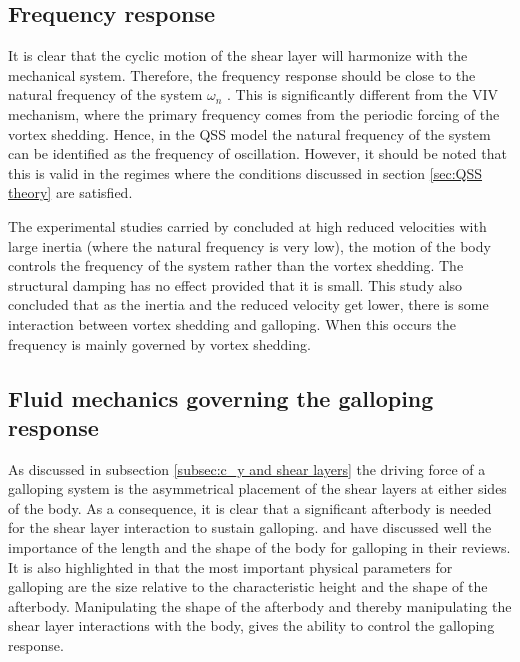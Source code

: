 \subsection{Frequency response}
 
 It is clear that the cyclic motion of the shear layer will harmonize with the mechanical system. Therefore, the frequency response should be close to the natural frequency of the system $\omega_{n}$ \citep{Paidoussis2010}. This is significantly different from the VIV mechanism, where the primary frequency comes from the periodic forcing of the vortex shedding. Hence, in the QSS model the natural frequency of the system can be identified as the frequency of oscillation. However, it should be  noted that this is valid in the regimes where the conditions discussed in section \ref{sec:QSS theory} are satisfied. 
 
 The experimental studies carried by \citet{bouclin:77} concluded at high reduced velocities with large inertia (where the natural frequency is very low), the motion of the body controls the frequency of the system rather than the vortex shedding. The structural damping has no effect provided that it is small. This study also concluded that as the inertia and the reduced velocity get lower, there is some interaction between vortex shedding and galloping. When this occurs the frequency is mainly governed by vortex shedding. 
 
 \subsection{Fluid mechanics governing the galloping response}
 \label{subsec:fluid_mechanics_of_galloping}
 
 As discussed in subsection \ref{subsec:c_y and shear layers} the driving force of a galloping system is the asymmetrical placement of the shear layers at either sides of the body. As a consequence, it is clear that a significant afterbody is needed for the shear layer interaction to sustain galloping. \citet{Parkinson1974,Parkinson1989} and \citet{Bearman1987} have discussed well the importance of the length and the shape of the body for galloping in their reviews. It is also highlighted in \citet{Parkinson1974} that the most important physical parameters for galloping are the size relative to the characteristic height and the shape of the afterbody. Manipulating the shape of the afterbody and thereby manipulating the shear layer interactions with the body, gives the ability to control the galloping response.
 
